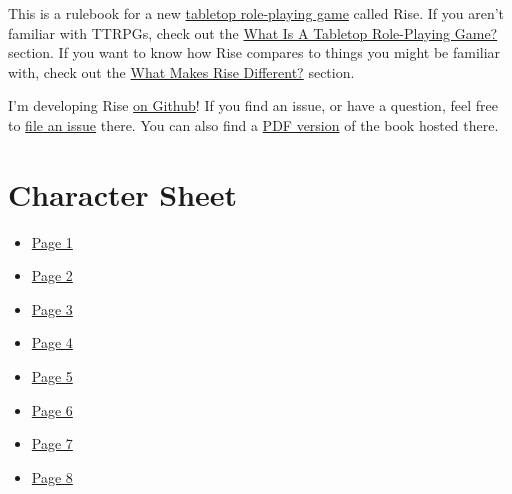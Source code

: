 \documentclass[oneside]{book} %
\begin{document}
This is a rulebook for a new \href{https://en.wikipedia.org/wiki/Tabletop_role-playing_game}{tabletop role-playing game} called Rise.
If you aren't familiar with TTRPGs, check out the \href{/rise/risese1.html}{What Is A Tabletop Role-Playing Game?} section.
If you want to know how Rise compares to things you might be familiar with, check out the \href{/rise/risese2.html}{What Makes Rise Different?} section.

I'm developing Rise \href{https://github.com/Vadskye/Rise}{on Github}! If you find an issue, or have a question, feel free to \href{https://github.com/Vadskye/Rise/issues/new/choose}{file an issue} there. You can also find a \href{https://github.com/Vadskye/Rise/raw/master/core_book/Rise.pdf}{PDF version} of the book hosted there.

\tableofcontents




















\appendix















\chapter{Character Sheet}

\begin{itemize}
    \item \href{/rise/character-sheet/page1}{Page 1}
    \item \href{/rise/character-sheet/page2}{Page 2}
    \item \href{/rise/character-sheet/page3}{Page 3}
    \item \href{/rise/character-sheet/page4}{Page 4}
    \item \href{/rise/character-sheet/page5}{Page 5}
    \item \href{/rise/character-sheet/page6}{Page 6}
    \item \href{/rise/character-sheet/page7}{Page 7}
    \item \href{/rise/character-sheet/page8}{Page 8}
\end{itemize}
\end{document}
